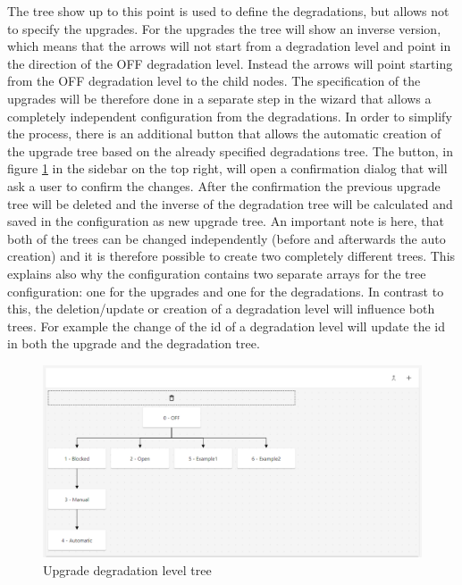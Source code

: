 The tree show up to this point is used to define the degradations, but allows not to specify the upgrades. For the upgrades the tree will show an inverse version, which means that the arrows will not start from a degradation level and point in the direction of the OFF degradation level. Instead the arrows will point starting from the OFF degradation level to the child nodes.
The specification of the upgrades will be therefore done in a separate step in the wizard that allows a completely independent configuration from the degradations. In order to simplify the process, there is an additional button that allows the automatic creation of the upgrade tree based on the already specified degradations tree. The button, in figure \ref{fig:upgrade_level_tree_drop} in the sidebar on the top right, will open a confirmation dialog that will ask a user to confirm the changes. After the confirmation the previous upgrade tree will be deleted and the inverse of the degradation tree will be calculated and saved in the configuration as new upgrade tree. An important note is here, that both of the trees can be changed independently (before and afterwards the auto creation) and it is therefore possible to create two completely different trees. This explains also why the configuration contains two separate arrays for the tree configuration: one for the upgrades and one for the degradations. In contrast to this, the deletion/update or creation of a degradation level will influence both trees. For example the change of the id of a degradation level will update the id in both the upgrade and the degradation tree.

\begin{figure}[ht]
    \centering
    \includegraphics[width=\textwidth]{img/upgrade_tree.png}
    \caption{Upgrade degradation level tree}
    \label{fig:upgrade_level_tree_drop}
\end{figure}


